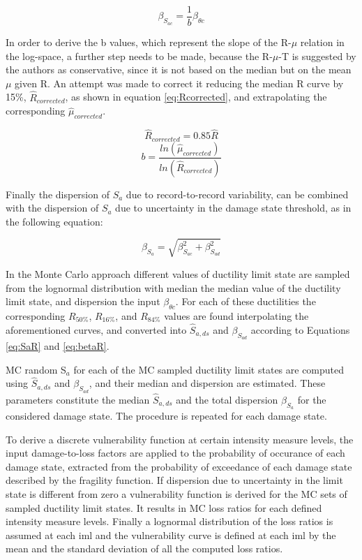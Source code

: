 \begin{equation}
\beta_{S_{a c}} = \frac{1}{b} \beta_{\theta c}
\label{eq:betasc_DF}
\end{equation}

In order to derive the b values, which represent the slope of the R-$\mu$ relation in the log-space, a further step needs to be made, because the R-$\mu$-T is suggested by the authors as conservative, since it is not based on the median but on the mean $\mu$ given R. An attempt was made to correct it reducing the median R curve by 15\%, $\hat{R}_{corrected}$, as shown in equation \ref{eq:Rcorrected}, and extrapolating the corresponding $\hat{\mu}_{corrected}$.

\begin{equation}
\hat{R}_{corrected}=0.85\hat{R}
\label{eq:Rcorrected}
\end{equation}
\begin{equation}
b = \frac{ln(\hat{\mu}_{corrected})}{ln(\hat{R}_{corrected})}
\label{eq:bcorrected_DF}
\end{equation}

Finally the dispersion of $S_a$ due to record-to-record variability, can be combined with the dispersion of $S_a$ due to uncertainty in the damage state threshold, as in the following equation:

\begin{equation}
\beta_{S_a} = \sqrt{\beta_{S_{a c}}^2+\beta_{S_{a d}}^2}
\label{eq:betatot_DF}
\end{equation}

In the Monte Carlo approach different values of ductility limit state are sampled from the lognormal distribution with median the median value of the ductility limit state, and dispersion the input $\beta_{\theta c}$.
For each of these ductilities the corresponding $R_{50\%}$, $R_{16\%}$, and $R_{84\%}$ values are found interpolating the aforementioned curves, and converted into $\hat{S}_{a,ds}$ and $\beta_{S_{a d}}$ according to Equations \ref{eq:SaR} and \ref{eq:betaR}.

MC random S$_a$ for each of the MC sampled ductility limit states are computed using $\hat{S}_{a,ds}$ and $\beta_{S_{a d}}$, and their median and dispersion are estimated. These parameters constitute the median $\hat{S}_{a,ds}$ and the total dispersion $\beta_{S_a}$ for the considered damage state. The procedure is repeated for each damage state.

To derive a discrete vulnerability function at certain intensity measure levels, the input damage-to-loss factors are applied to the probability of occurance of each damage state, extracted from the probability of exceedance of each damage state described by the fragility function.
If dispersion due to uncertainty in the limit state is different from zero a vulnerability function is derived for the MC sets of sampled ductility limit states. It results in MC loss ratios for each defined intensity measure levels. Finally a lognormal distribution of the loss ratios is assumed at each iml and the vulnerability curve is defined at each iml by the mean and the standard deviation of all the computed loss ratios.

